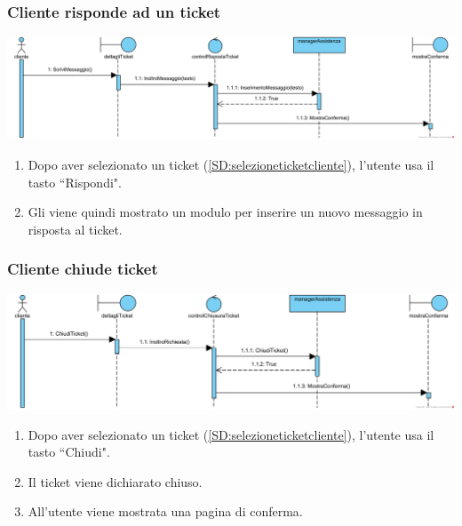 \documentclass[12pt,a4paper]{article}
\begin{document}
\newpage

\subsubsection{Cliente risponde ad un ticket}
\label{SD:rispostaticketcliente}

\begin{center}
\includegraphics[width=\textwidth]{SequenceDiagram/ClienteTicketRisponde}
\end{center}

\begin{enumerate}
\item Dopo aver selezionato un ticket (\ref{SD:selezioneticketcliente}), l'utente usa il tasto ``Rispondi".
\item Gli viene quindi mostrato un modulo per inserire un nuovo messaggio in risposta al ticket.
\end{enumerate}

\subsubsection{Cliente chiude ticket}
\label{SD:chiusuraticket}

\begin{center}
\includegraphics[width=\textwidth]{SequenceDiagram/ClienteTicketChiusura}
\end{center}

\begin{enumerate}
\item Dopo aver selezionato un ticket (\ref{SD:selezioneticketcliente}), l'utente usa il tasto ``Chiudi".
\item Il ticket viene dichiarato chiuso.
\item All'utente viene mostrata una pagina di conferma.
\end{enumerate}
\end{document}

